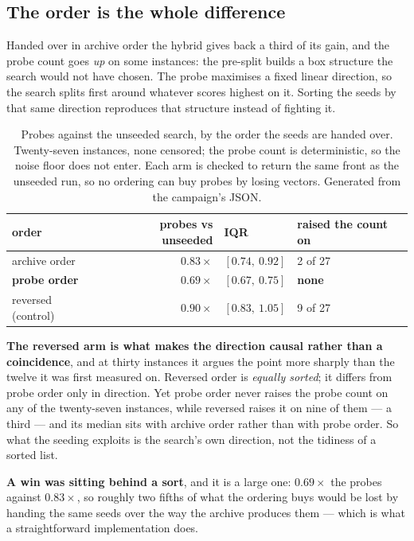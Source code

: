 \documentclass[11pt,a4paper]{article}
\begin{document}
\subsection{The order is the whole difference}
\label{sec:order}

Handed over in archive order the hybrid gives back a third of its gain, and
the probe count goes \emph{up} on some instances: the pre-split builds a box
structure the search would not have chosen.  The probe maximises a fixed
linear direction, so the search splits first around whatever scores highest on
it.  Sorting the seeds by that same direction reproduces that structure
instead of fighting it.

\begin{table}[h]
\centering
\caption{Probes against the unseeded search, by the order the seeds are handed
over.  Twenty-seven instances, none censored; the probe count is deterministic,
so the noise floor does not enter.  Each arm is checked to return the same
front as the unseeded run, so no ordering can buy probes by losing vectors.
Generated from the campaign's JSON.}
\begin{tabular}{lrll}
\toprule
order & probes vs unseeded & IQR & raised the count on \\
\midrule
archive order & $0.83\times$ & $[0.74,\ 0.92]$ & 2 of 27 \\
\textbf{probe order} & $\mathbf{0.69}\times$ & $[0.67,\ 0.75]$ & \textbf{none} \\
reversed (control) & $0.90\times$ & $[0.83,\ 1.05]$ & 9 of 27 \\
\bottomrule
\end{tabular}
\end{table}

\noindent
\textbf{The reversed arm is what makes the direction causal rather than a
coincidence}, and at thirty instances it argues the point more sharply than
the twelve it was first measured on.  Reversed order is \emph{equally sorted};
it differs from probe order only in direction.  Yet probe order never raises
the probe count on any of the twenty-seven instances, while reversed raises it
on nine of them --- a third --- and its median sits with archive order rather
than with probe order.  So what the seeding exploits is the search's own
direction, not the tidiness of a sorted list.

\textbf{A win was sitting behind a sort}, and it is a large one: $0.69\times$
the probes against $0.83\times$, so roughly two fifths of what the ordering
buys would be lost by handing the same seeds over the way the archive produces
them --- which is what a straightforward implementation does.
\end{document}
